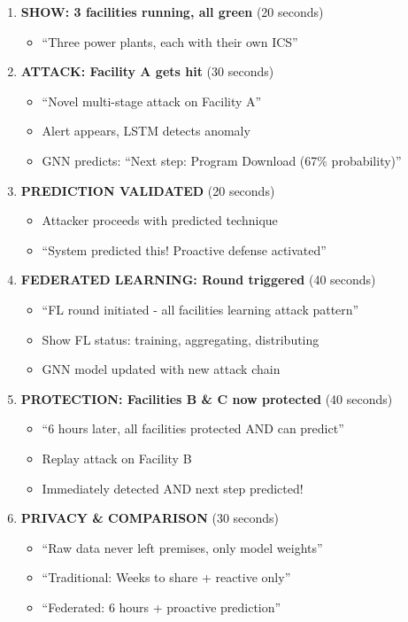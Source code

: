 \documentclass[11pt,a4paper]{article}
\begin{document}
\begin{enumerate}[leftmargin=*]
    \item \textbf{SHOW: 3 facilities running, all green} (20 seconds)
    \begin{itemize}
        \item ``Three power plants, each with their own ICS''
    \end{itemize}
    
    \item \textbf{ATTACK: Facility A gets hit} (30 seconds)
    \begin{itemize}
        \item ``Novel multi-stage attack on Facility A''
        \item Alert appears, LSTM detects anomaly
        \item GNN predicts: ``Next step: Program Download (67\% probability)''
    \end{itemize}
    
    \item \textbf{PREDICTION VALIDATED} (20 seconds)
    \begin{itemize}
        \item Attacker proceeds with predicted technique
        \item ``System predicted this! Proactive defense activated''
    \end{itemize}
    
    \item \textbf{FEDERATED LEARNING: Round triggered} (40 seconds)
    \begin{itemize}
        \item ``FL round initiated - all facilities learning attack pattern''
        \item Show FL status: training, aggregating, distributing
        \item GNN model updated with new attack chain
    \end{itemize}
    
    \item \textbf{PROTECTION: Facilities B \& C now protected} (40 seconds)
    \begin{itemize}
        \item ``6 hours later, all facilities protected AND can predict''
        \item Replay attack on Facility B
        \item Immediately detected AND next step predicted!
    \end{itemize}
    
    \item \textbf{PRIVACY \& COMPARISON} (30 seconds)
    \begin{itemize}
        \item ``Raw data never left premises, only model weights''
        \item ``Traditional: Weeks to share + reactive only''
        \item ``Federated: 6 hours + proactive prediction''
    \end{itemize}
\end{enumerate}
\end{document}
